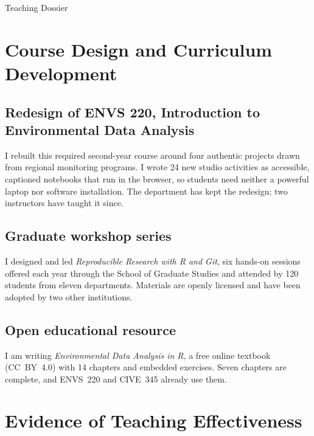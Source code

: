 \begin{applicationdocument}[
  contents,
  numbered,
  subtitle = {Prepared for the position of \PositionSummary},
]{Teaching Dossier}
\section{Course Design and Curriculum Development}

\subsection{Redesign of ENVS 220, Introduction to Environmental Data Analysis}
I rebuilt this required second-year course around four authentic projects
drawn from regional monitoring programs. I wrote 24 new studio
activities as accessible, captioned notebooks that run in the browser,
so students need neither a powerful laptop nor software installation. The
department has kept the redesign; two instructors have taught it since.

\subsection{Graduate workshop series}
I designed and led \emph{Reproducible Research with R and Git}, six
hands-on sessions offered each year through the School of Graduate Studies
and attended by 120 students from eleven departments. Materials are openly
licensed and have been adopted by two other institutions.

\subsection{Open educational resource}
I am writing \emph{Environmental Data Analysis in R}, a free online textbook
(CC~BY~4.0) with 14 chapters and embedded exercises. Seven chapters are
complete, and ENVS~220 and CIVE~345 already use them.

\section{Evidence of Teaching Effectiveness}

\begin{keystats}[4]
\end{keystats}



\end{applicationdocument}
